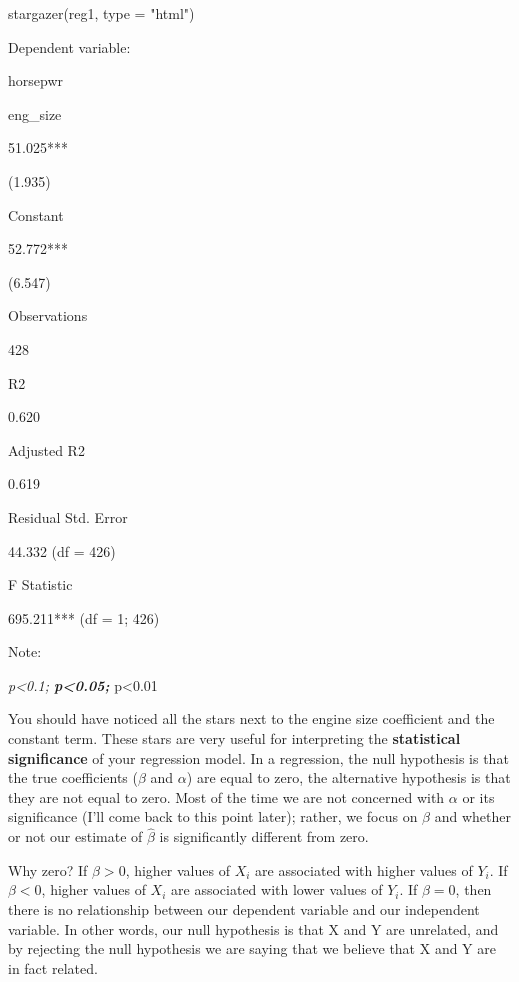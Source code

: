 \documentclass[
  letterpaper,
]{book}
\newenvironment{Shaded}{\begin{snugshade}}{\end{snugshade}}
\newcommand{\AttributeTok}[1]{\textcolor[rgb]{0.40,0.45,0.13}{#1}}
\newcommand{\FunctionTok}[1]{\textcolor[rgb]{0.28,0.35,0.67}{#1}}
\newcommand{\NormalTok}[1]{\textcolor[rgb]{0.00,0.23,0.31}{#1}}
\newcommand{\StringTok}[1]{\textcolor[rgb]{0.13,0.47,0.30}{#1}}
\begin{document}
\begin{Shaded}
\begin{Highlighting}[]
\FunctionTok{stargazer}\NormalTok{(reg1, }\AttributeTok{type =} \StringTok{"html"}\NormalTok{)}
\end{Highlighting}
\end{Shaded}

Dependent variable:

horsepwr

eng\_size

51.025***

(1.935)

Constant

52.772***

(6.547)

Observations

428

R2

0.620

Adjusted R2

0.619

Residual Std. Error

44.332 (df = 426)

F Statistic

695.211*** (df = 1; 426)

Note:

\emph{p\textless0.1; \textbf{p\textless0.05; }}p\textless0.01

You should have noticed all the stars next to the engine size
coefficient and the constant term. These stars are very useful for
interpreting the \textbf{statistical significance} of your regression
model. In a regression, the null hypothesis is that the true
coefficients (\(\beta\) and \(\alpha\)) are equal to zero, the
alternative hypothesis is that they are not equal to zero. Most of the
time we are not concerned with \(\alpha\) or its significance (I'll come
back to this point later); rather, we focus on \(\beta\) and whether or
not our estimate of \(\hat{\beta}\) is significantly different from
zero.

Why zero? If \(\beta > 0\), higher values of \(X_i\) are associated with
higher values of \(Y_i\). If \(\beta < 0\), higher values of \(X_i\) are
associated with lower values of \(Y_i\). If \(\beta = 0\), then there is
no relationship between our dependent variable and our independent
variable. In other words, our null hypothesis is that X and Y are
unrelated, and by rejecting the null hypothesis we are saying that we
believe that X and Y are in fact related.
\end{document}
